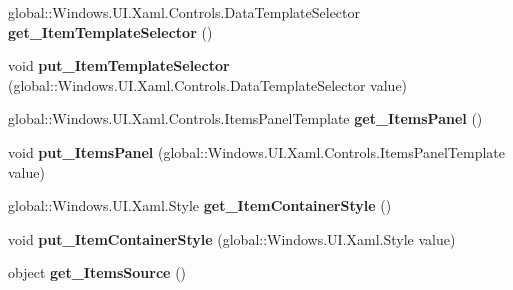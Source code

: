 \begin{DoxyCompactItemize}
\mbox{\label{interface_windows_1_1_u_i_1_1_xaml_1_1_controls_1_1_i_items_control_ab87924da926fb493c4e9f1d66f5e3327}} 
global\+::\+Windows.\+U\+I.\+Xaml.\+Controls.\+Data\+Template\+Selector {\bfseries get\+\_\+\+Item\+Template\+Selector} ()
\item 
\mbox{\label{interface_windows_1_1_u_i_1_1_xaml_1_1_controls_1_1_i_items_control_aa561637adcee5715eed974d70e6d813a}} 
void {\bfseries put\+\_\+\+Item\+Template\+Selector} (global\+::\+Windows.\+U\+I.\+Xaml.\+Controls.\+Data\+Template\+Selector value)
\item 
\mbox{\label{interface_windows_1_1_u_i_1_1_xaml_1_1_controls_1_1_i_items_control_ab7176badfe60bbefeb142105c2d8637a}} 
global\+::\+Windows.\+U\+I.\+Xaml.\+Controls.\+Items\+Panel\+Template {\bfseries get\+\_\+\+Items\+Panel} ()
\item 
\mbox{\label{interface_windows_1_1_u_i_1_1_xaml_1_1_controls_1_1_i_items_control_af7be75b1cc3df63d782025e03364f6ea}} 
void {\bfseries put\+\_\+\+Items\+Panel} (global\+::\+Windows.\+U\+I.\+Xaml.\+Controls.\+Items\+Panel\+Template value)
\item 
\mbox{\label{interface_windows_1_1_u_i_1_1_xaml_1_1_controls_1_1_i_items_control_a4459707c1f50a2985881f9d3053ab38f}} 
global\+::\+Windows.\+U\+I.\+Xaml.\+Style {\bfseries get\+\_\+\+Item\+Container\+Style} ()
\item 
\mbox{\label{interface_windows_1_1_u_i_1_1_xaml_1_1_controls_1_1_i_items_control_ac812f5bc0cf3f55197783982db3f878d}} 
void {\bfseries put\+\_\+\+Item\+Container\+Style} (global\+::\+Windows.\+U\+I.\+Xaml.\+Style value)
\item 
\mbox{\label{interface_windows_1_1_u_i_1_1_xaml_1_1_controls_1_1_i_items_control_a7f2312123673103e92e3794fabb7c45a}} 
object {\bfseries get\+\_\+\+Items\+Source} ()

\end{DoxyCompactItemize}
